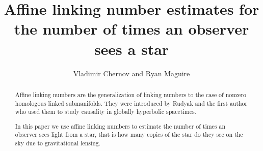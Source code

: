 \documentclass[12pt,reqno,a4paper]{amsart}
\begin{document}
\let\kappa=\varkappa
\let\eps=\varepsilon
\let\phi=\varphi
\let\p\partial

\def\Z{\mathbb Z}
\def\R{\mathbb R}
\def\C{\mathbb C}
\def\Q{\mathbb Q}
\def\P{\mathbb P}
\def\HH{\mathrm{H}}
\def\ss{{X}}

\def\conj{\overline}
\def\Beta{\mathrm{B}}
\def\const{\mathrm{const}}
\def\ov{\overline}

\renewcommand{\Im}{\mathop{\mathrm{Im}}\nolimits}
\renewcommand{\Re}{\mathop{\mathrm{Re}}\nolimits}
\newcommand{\codim}{\mathop{\mathrm{codim}}\nolimits}
\newcommand{\id}{\mathop{\mathrm{id}}\nolimits}
\newcommand{\Aut}{\mathop{\mathrm{Aut}}\nolimits}
\newcommand{\alk}{\mathop{\mathrm{alk}}\nolimits}
\newcommand{\lk}{\mathop{\mathrm{lk}}\nolimits}
\newcommand{\Ker}{\mathop{\mathrm{Ker}}\nolimits}
\newcommand{\sign}{\mathop{\mathrm{sign}}\nolimits}
\newcommand{\rk}{\mathop{\mathrm{rk}}\nolimits}
\def\Jet{{\mathcal J}}

\renewcommand{\mod}{\mathrel{\mathrm{mod}}}





\newtheorem{mainthm}{Theorem}
\renewcommand{\themainthm}{{\Alph{mainthm}}}
\newtheorem{thm}{Theorem}[subsection]
\newtheorem{lem}[thm]{Lemma}
\newtheorem{prop}[thm]{Proposition}
\newtheorem{cor}[thm]{Corollary}

\theoremstyle{definition}
\newtheorem{exm}[thm]{Example}
\newtheorem{rem}[thm]{Remark}
\newtheorem{df}[thm]{Definition}

\renewcommand{\thesubsection}{\arabic{subsection}}



\title[Affine linking number estimates]{Affine linking number estimates for the number of times an observer sees a star}
\author{Vladimir Chernov and Ryan Maguire}
\address{6188 Kemeny Hall, Department of Mathematics, Dartmouth College, Hanover, NH 03755, USA}
\address{6188 Kemeny Hall, Department of Mathematics, Dartmouth College, Hanover, NH 03755, USA}
\begin{abstract}
Affine linking numbers are the generalization of linking numbers to the case of nonzero homologous linked submanifolds. They were introduced by Rudyak and the first author who used them to study causality in globally hyperbolic spacetimes. 

In this paper we use affine linking numbers to estimate the number of times an observer sees light from a star, that is how many copies of the star do they see on the sky due to gravitational lensing.
\end{abstract}
\end{document}
